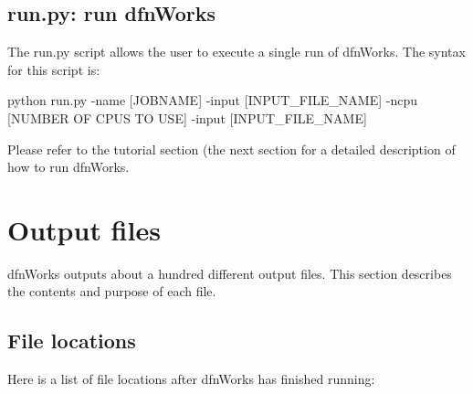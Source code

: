 \documentclass[letterpaper,10pt,english]{sphinxmanual}
\begin{document}
\section{run.py: run dfnWorks}
\label{scripts:run-py-run-dfnworks}
The run.py script allows the user to execute a single run of dfnWorks. The syntax for this script is:

python run.py -name {[}JOBNAME{]} -input {[}INPUT\_FILE\_NAME{]} -ncpu {[}NUMBER OF CPUS TO USE{]} -input {[}INPUT\_FILE\_NAME{]}

Please refer to the tutorial section (the next section for a detailed description of how to run dfnWorks.


\chapter{Output files}
\label{output:output-files}\label{output::doc}
dfnWorks outputs about a hundred different output files. This section describes the contents and purpose of each file.


\section{File locations}
\label{output:file-locations}
Here is a list of file locations after dfnWorks has finished running:
\end{document}
